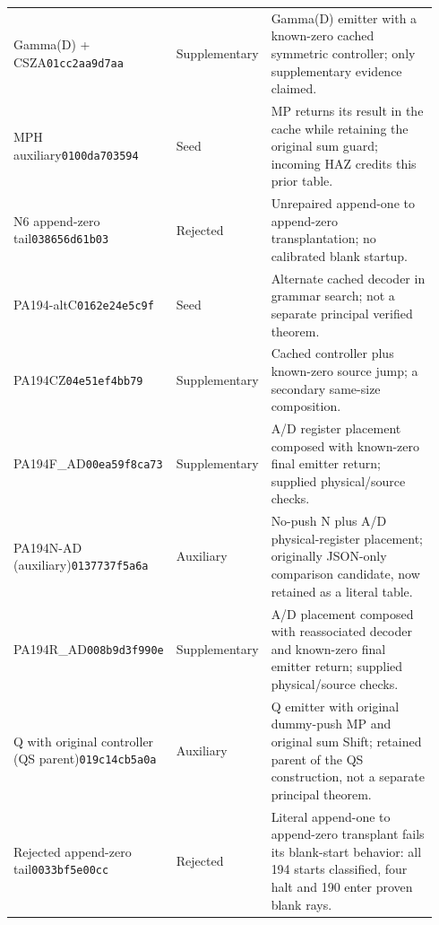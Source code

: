 {\begin{longtable}{@{}p{0.23\linewidth}p{0.13\linewidth}p{0.58\linewidth}@{}}
Gamma(D) + CSZA\newline\texttt{01cc2aa9d7aa} & Supplementary & Gamma(D) emitter with a known-zero cached symmetric controller; only supplementary evidence claimed.\\[2.5pt]
MPH auxiliary\newline\texttt{0100da703594} & Seed & MP returns its result in the cache while retaining the original sum guard; incoming HAZ credits this prior table.\\[2.5pt]
N6 append-zero tail\newline\texttt{038656d61b03} & Rejected & Unrepaired append-one to append-zero transplantation; no calibrated blank startup.\\[2.5pt]
PA194-altC\newline\texttt{0162e24e5c9f} & Seed & Alternate cached decoder in grammar search; not a separate principal verified theorem.\\[2.5pt]
PA194CZ\newline\texttt{04e51ef4bb79} & Supplementary & Cached controller plus known-zero source jump; a secondary same-size composition.\\[2.5pt]
PA194F\_\allowbreak AD\newline\texttt{00ea59f8ca73} & Supplementary & A/D register placement composed with known-zero final emitter return; supplied physical/source checks.\\[2.5pt]
PA194N-AD (auxiliary)\newline\texttt{0137737f5a6a} & Auxiliary & No-push N plus A/D physical-register placement; originally JSON-only comparison candidate, now retained as a literal table.\\[2.5pt]
PA194R\_\allowbreak AD\newline\texttt{008b9d3f990e} & Supplementary & A/D placement composed with reassociated decoder and known-zero final emitter return; supplied physical/source checks.\\[2.5pt]
Q with original controller (QS parent)\newline\texttt{019c14cb5a0a} & Auxiliary & Q emitter with original dummy-push MP and original sum Shift; retained parent of the QS construction, not a separate principal theorem.\\[2.5pt]
Rejected append-zero tail\newline\texttt{0033bf5e00cc} & Rejected & Literal append-one to append-zero transplant fails its blank-start behavior: all 194 starts classified, four halt and 190 enter proven blank rays.\\[2.5pt]

\end{longtable}}
